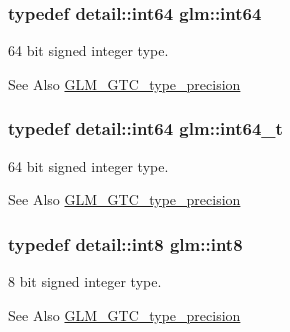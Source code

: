 \hypertarget{group__gtc__type__precision_ga435d75819cce297cc5fa21bd84ef89a5}{
\subsubsection[{int64}]{\setlength{\rightskip}{0pt plus 5cm}typedef detail\-::int64 {\bf glm\-::int64}}}\label{group__gtc__type__precision_ga435d75819cce297cc5fa21bd84ef89a5}
64 bit signed integer type. \begin{DoxySeeAlso}{See Also}
\hyperlink{group__gtc__type__precision}{G\-L\-M\-\_\-\-G\-T\-C\-\_\-type\-\_\-precision} 
\end{DoxySeeAlso}
\hypertarget{group__gtc__type__precision_ga6abb23fbf4e39c50ec5341160b5da5ab}{
\subsubsection[{int64\-\_\-t}]{\setlength{\rightskip}{0pt plus 5cm}typedef detail\-::int64 {\bf glm\-::int64\-\_\-t}}}\label{group__gtc__type__precision_ga6abb23fbf4e39c50ec5341160b5da5ab}
64 bit signed integer type. \begin{DoxySeeAlso}{See Also}
\hyperlink{group__gtc__type__precision}{G\-L\-M\-\_\-\-G\-T\-C\-\_\-type\-\_\-precision} 
\end{DoxySeeAlso}
\hypertarget{group__gtc__type__precision_ga96254f9c1c4506fc8eb5cf3301ce8565}{
\subsubsection[{int8}]{\setlength{\rightskip}{0pt plus 5cm}typedef detail\-::int8 {\bf glm\-::int8}}}\label{group__gtc__type__precision_ga96254f9c1c4506fc8eb5cf3301ce8565}
8 bit signed integer type. \begin{DoxySeeAlso}{See Also}
\hyperlink{group__gtc__type__precision}{G\-L\-M\-\_\-\-G\-T\-C\-\_\-type\-\_\-precision} 
\end{DoxySeeAlso}
